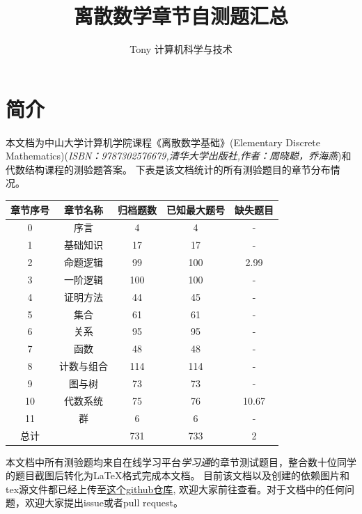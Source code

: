 \documentclass[UTF8, heading=true]{ctexart}
\title{\LARGE \textbf{离散数学章节自测题汇总}}
\author{Tony \hspace{2.89cm} 计算机科学与技术}
\begin{document}
\maketitle



{}
\section*{简介}

本文档为中山大学计算机学院课程《离散数学基础》(Elementary Discrete Mathematics)(\textit{ISBN：9787302576679,清华大学出版社,作者：周晓聪，乔海燕})和代数结构课程的测验题答案。
下表是该文档统计的所有测验题目的章节分布情况。
\begin{table}[H]
  \renewcommand{\arraystretch}{1.5}
  \centering
\begin{tabular}{|c|c|c|c|c|}
  \hline 章节序号 & 章节名称 & 归档题数 & 已知最大题号 & 缺失题目 \\
  \hline 0 & 序言 & 4 & 4 & - \\
  \hline 1 & 基础知识 & 17 & 17 & - \\
  \hline 2 & 命题逻辑 & 99 & 100 & 2.99 \\
  \hline 3 & 一阶逻辑 & 100 & 100 & - \\
  \hline 4 & 证明方法 & 44 & 45 & - \\
  \hline 5 & 集合 & 61 & 61 & - \\
  \hline 6 & 关系 & 95 & 95 & - \\
  \hline 7 & 函数 & 48 & 48 & - \\
  \hline 8 & 计数与组合 & 114 & 114 & - \\
  \hline 9 & 图与树 & 73 & 73 & - \\
  \hline 10 & 代数系统 & 75 & 76 & 10.67\\
  \hline 11 & 群 & 6 & 6 & - \\
  \hline 总计& & 731 & 733 & 2 \\
  \hline
  \end{tabular}
\end{table}

本文档中所有测验题均来自在线学习平台\textit{学习通}的章节测试题目，整合数十位同学的题目截图后转化为LaTeX格式完成本文档。
目前该文档以及创建的依赖图片和tex源文件都已经上传至\href{https://github.com/BlackMaple1203/SYSU-Discrete-Mathematics-Exam-Answers}{这个github仓库},
欢迎大家前往查看。对于文档中的任何问题，欢迎大家提出issue或者pull request。
\end{document}
